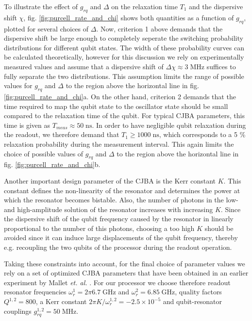 \smallskip

To illustrate the effect of $g_{rq}$ and $\Delta$ on the relaxation time $T_1$ and the dispersive shift $\chi$, fig. \ref{fig:purcell_rate_and_chi} shows both quantities as a function of $g_{rq}$, plotted for several choices of $\Delta$. Now, criterion 1 above demands that the dispersive shift be large enough to completely seperate the switching probability distributions for different qubit states. The width of these probability curves can be calculated theoretically, however for this discussion we rely on experimentally measured values and assume that a dispersive shift of $\Delta \chi \approx 3\;\mathrm{MHz}$ suffices to fully separate the two distributions. This assumption limits the range of possible values for $g_{rq}$ and $\Delta$ to the region above the horizontal line in fig. \ref{fig:purcell_rate_and_chi}a. On the other hand, criterion 2 demands that the time required to map the qubit state to the oscillator state should be small compared to the relaxation time of the qubit. For typical CJBA parameters, this time is given as $T_{meas}\approx 50\;\mathrm{ns}$. In order to have negligible qubit relaxation during the readout, we therefore demand that $T_1 \ge 1000\;\mathrm{ns}$, which corresponds to a 5 \% relaxation probability during the measurement interval. This again limits the choice of possible values of $g_{rq}$ and $\Delta$ to the region above the horizontal line in fig. \ref{fig:purcell_rate_and_chi}b. 

\smallskip

Another important design parameter of the CJBA is the Kerr constant $K$. This constant defines the non-linearity of the resonator and determines the power at which the resonator becomes bistable. Also, the number of photons in the low- and high-amplitude solution of the resonator increases with increasing $K$. Since the dispersive shift of the qubit frequency caused by the resonator in linearly proportional to the number of this photons, choosing a too high $K$ should be avoided since it can induce large displacements of the qubit frequency, thereby e.g. recoupling the two qubits of the processor during the readout operation.

\smallskip

Taking these constraints into account, for the final choice of parameter values we rely on a set of optimized CJBA parameters that have been obtained in an earlier experiment by Mallet {\it et. al.} \citep{mallet_single-shot_2009}. For our processor we choose therefore readout resonator frequencies $\omega_r^1 = 2\pi 6.7 \;\mathrm{GHz}$ and $\omega_r^2 = 6.85\;\mathrm{GHz}$, quality factors $Q^{1,2}=800$, a Kerr constant $2\pi K/\omega_r^{1,2}=-2.5\times 10^{-5}$ and qubit-resonator couplings $g_{rq}^{1,2}=50\;\mathrm{MHz}$.


